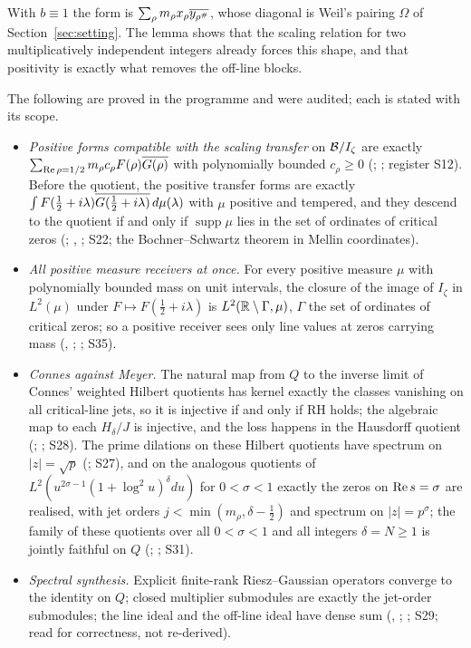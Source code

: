 With $b\equiv1$ the form is $\sum_\rho m_\rho x_\rho\overline{y_{\rho^\#}}$, whose diagonal is Weil's pairing $\Omega$ of Section~\ref{sec:setting}. The lemma shows that the scaling relation for two multiplicatively independent integers already forces this shape, and that positivity is exactly what removes the off-line blocks.

The following are proved in the programme and were audited; each is stated with its scope.
\begin{itemize}
\item \emph{Positive forms compatible with the scaling transfer} on $\mathcal{B}/I_\zeta$ are exactly $\sum_{\operatorname{Re}\rho=1/2}m_\rho c_\rho F(\rho)\overline{G(\rho)}$ with polynomially bounded $c_\rho\ge0$ (; ; register S12). Before the quotient, the positive transfer forms are exactly $\int F(\tfrac12+i\lambda)\overline{G(\tfrac12+i\lambda)}\,d\mu(\lambda)$ with $\mu$ positive and tempered, and they descend to the quotient if and only if $\operatorname{supp}\mu$ lies in the set of ordinates of critical zeros (; , ; S22; the Bochner--Schwartz theorem in Mellin coordinates).
\item \emph{All positive measure receivers at once.} For every positive measure $\mu$ with polynomially bounded mass on unit intervals, the closure of the image of $I_\zeta$ in $L^2(\mu)$ under $F\mapsto F(\tfrac12+i\lambda)$ is $L^2(\mathbb{R}\setminus\Gamma,\mu)$, $\Gamma$ the set of ordinates of critical zeros; so a positive receiver sees only line values at zeros carrying mass (, ; ; S35).
\item \emph{Connes against Meyer.} The natural map from $Q$ to the inverse limit of Connes' weighted Hilbert quotients \cite{Connes} has kernel exactly the classes vanishing on all critical-line jets, so it is injective if and only if RH holds; the algebraic map to each $H_\delta/J$ is injective, and the loss happens in the Hausdorff quotient (; ; S28). The prime dilations on these Hilbert quotients have spectrum on $|z|=\sqrt p$ (; S27), and on the analogous quotients of $L^2(u^{2\sigma-1}(1+\log^2u)^\delta du)$ for $0<\sigma<1$ exactly the zeros on $\operatorname{Re} s=\sigma$ are realised, with jet orders $j<\min(m_\rho,\delta-\tfrac12)$ and spectrum on $|z|=p^\sigma$; the family of these quotients over all $0<\sigma<1$ and all integers $\delta=N\ge1$ is jointly faithful on $Q$ (; ; S31).
\item \emph{Spectral synthesis.} Explicit finite-rank Riesz--Gaussian operators converge to the identity on $Q$; closed multiplier submodules are exactly the jet-order submodules; the line ideal and the off-line ideal have dense sum (, ; ; S29; read for correctness, not re-derived).

\end{itemize}
